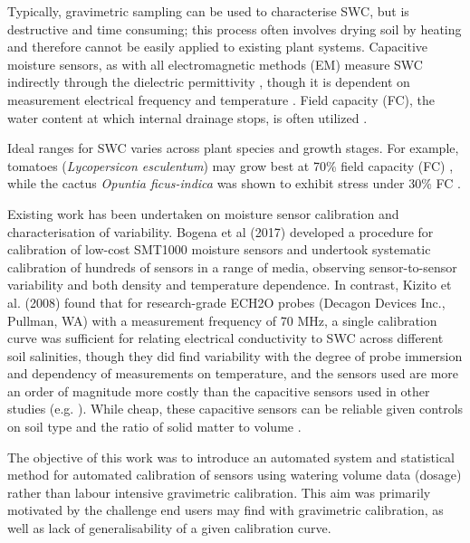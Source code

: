 \documentclass[11pt]{article}
\begin{document}
Typically, gravimetric sampling can be used to characterise SWC, but is destructive and time consuming; this process often involves drying soil by heating and therefore cannot be easily applied to existing plant systems. Capacitive moisture sensors, as with all electromagnetic methods (EM) measure SWC indirectly through the dielectric permittivity \cite{kelleners2005-frequency-dependence}, though it is dependent on measurement electrical frequency \cite{kelleners2005-frequency-dependence,sheng2025-frequency} and temperature \cite{jones2005-em-methodology}. Field capacity (FC), the water content at which internal drainage stops, is often utilized \cite{jury2004soil}. 

Ideal ranges for SWC varies across plant species and growth stages. For example, tomatoes (\textit{Lycopersicon esculentum}) may grow best at 70\% field capacity (FC) \cite{liu2019tomato}, while the cactus \textit{Opuntia ficus-indica} was shown to exhibit stress under 30\% FC \cite{lahbouki2023effects}.

Existing work has been undertaken on moisture sensor calibration and characterisation of variability. Bogena et al (2017) \cite{bogena2017-calibration} developed a procedure for calibration of low-cost SMT1000 moisture sensors and undertook systematic calibration of hundreds of sensors in a range of media, observing sensor-to-sensor variability and both density and temperature dependence. In contrast, Kizito et al. (2008) \cite{kizito2008-frequency} found that for research-grade ECH2O probes (Decagon Devices Inc., Pullman, WA) with a measurement frequency of 70 MHz, a single calibration curve was sufficient for relating electrical conductivity to SWC across different soil salinities, though they did find variability with the degree of probe immersion and dependency of measurements on temperature, and the sensors used are more an order of magnitude more costly than the capacitive sensors used in other studies (e.g. \cite{sudarmaji2024-smart-soil}). While cheap, these capacitive sensors can be reliable given controls on soil type and the ratio of solid matter to volume \cite{placidi2020characterization}.

The objective of this work was to introduce an automated system and statistical method for automated calibration of sensors using watering volume data (dosage) rather than labour intensive gravimetric calibration. This aim was primarily motivated by the challenge end users may find with gravimetric calibration, as well as lack of generalisability of a given calibration curve.
\end{document}
